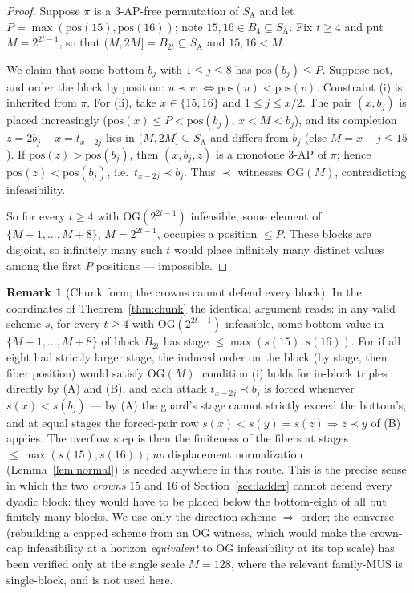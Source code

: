 \documentclass[11pt]{article}
\theoremstyle{definition}
\newtheorem{remark}[theorem]{Remark}
\newcommand{\SA}{S_{\mathrm{A}}}
\newcommand{\pos}{\mathrm{pos}}
\newcommand{\OG}{\mathrm{OG}}
\begin{document}
\begin{proof}
Suppose $\pi$ is a $3$-AP-free permutation of $\SA$ and let
$P = \max(\pos(15), \pos(16))$; note $15, 16 \in B_4 \subseteq \SA$. Fix
$t \ge 4$ and put $M = 2^{2t-1}$, so that $(M, 2M] = B_{2t} \subseteq
\SA$ and $15, 16 < M$.

We claim that some bottom $b_j$ with $1 \le j \le 8$ has
$\pos(b_j) \le P$. Suppose not, and order the block by position:
$u \prec v :\!\iff \pos(u) < \pos(v)$. Constraint (i) is inherited from
$\pi$. For (ii), take $x \in \{15, 16\}$ and $1 \le j \le x/2$. The pair
$(x, b_j)$ is placed increasingly ($\pos(x) \le P < \pos(b_j)$, $x < M <
b_j$), and its completion $z = 2b_j - x = t_{x-2j}$ lies in
$(M, 2M] \subseteq \SA$ and differs from $b_j$ (else $M = x - j \le
15$). If $\pos(z) > \pos(b_j)$, then $(x, b_j, z)$ is a monotone $3$-AP
of $\pi$; hence $\pos(z) < \pos(b_j)$, i.e.\ $t_{x-2j} \prec b_j$. Thus
$\prec$ witnesses $\OG(M)$, contradicting infeasibility.

So for every $t \ge 4$ with $\OG(2^{2t-1})$ infeasible, some element of
$\{M+1, \dots, M+8\}$, $M = 2^{2t-1}$, occupies a position $\le P$.
These blocks are disjoint, so infinitely many such $t$ would place
infinitely many distinct values among the first $P$ positions ---
impossible.
\end{proof}

\begin{remark}[Chunk form; the crowns cannot defend every block]
\label{rem:ogchunk}
In the coordinates of Theorem~\ref{thm:chunk} the identical argument
reads: in any valid scheme $s$, for every $t \ge 4$ with
$\OG(2^{2t-1})$ infeasible, some bottom value in
$\{M+1, \dots, M+8\}$ of block $B_{2t}$ has stage
$\le \max(s(15), s(16))$. For if all eight had strictly larger stage,
the induced order on the block (by stage, then fiber position) would
satisfy $\OG(M)$: condition (i) holds for in-block triples directly by
(A) and (B), and each attack $t_{x-2j} \prec b_j$ is forced whenever
$s(x) < s(b_j)$ --- by (A) the guard's stage cannot strictly exceed the
bottom's, and at equal stages the forced-pair row
$s(x) < s(y) = s(z) \Rightarrow z \prec y$ of (B) applies. The overflow
step is then the finiteness of the fibers at stages
$\le \max(s(15), s(16))$; \emph{no} displacement normalization
(Lemma~\ref{lem:normal}) is needed anywhere in this route. This is the
precise sense in which the two \emph{crowns} $15$ and $16$ of
Section~\ref{sec:ladder} cannot defend every dyadic block: they would
have to be placed below the bottom-eight of all but finitely many
blocks. We use only the direction scheme $\Rightarrow$ order; the
converse (rebuilding a capped scheme from an $\OG$ witness, which would
make the crown-cap infeasibility at a horizon \emph{equivalent} to
$\OG$ infeasibility at its top scale) has been verified only at the
single scale $M = 128$, where the relevant family-MUS is single-block,
and is not used here.
\end{remark}
\end{document}
